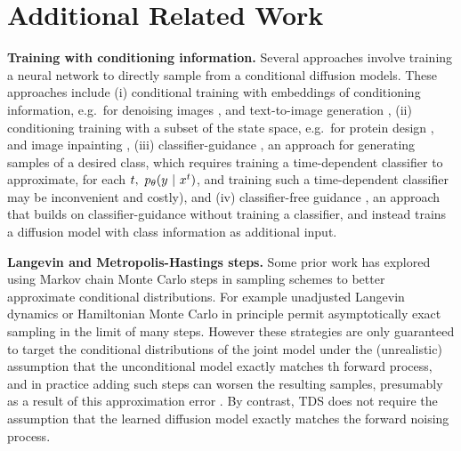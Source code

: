 \section{Additional Related Work}\label{sec:additional_related_work}

\textbf{Training with conditioning information.}
Several approaches involve training a neural network to directly sample from a conditional diffusion models.
These approaches include
(i) conditional training with embeddings of conditioning information, e.g.\ for denoising images \citep{saharia2022image}, and text-to-image generation \citep{ramesh2022hierarchical},
(ii) conditioning training with a subset of the state space, e.g.\ for protein design \citep{watson2022broadly}, and 
image inpainting \citep{saharia2022palette},
(iii) classifier-guidance \citep{dhariwal2021diffusion,song2020score}, an approach for generating samples of a desired class, which requires training a time-dependent classifier to approximate, for each $t,\ p_{\theta} (y~\vert~ x^{t})$, and training such a time-dependent classifier may be inconvenient and costly), and %
(iv) classifier-free guidance \citep{ho2022classifier}, an approach that builds on classifier-guidance without training a classifier, and instead trains a diffusion model with class information as  additional input.


\textbf{Langevin and Metropolis-Hastings steps.}
Some prior work has explored using Markov chain Monte Carlo steps in sampling schemes to better approximate conditional distributions.
For example unadjusted Langevin dynamics \citep{hovideo,song2020score} or Hamiltonian Monte Carlo \citep{du2023reduce} in principle permit asymptotically exact sampling in the limit of many steps.
However these strategies are only guaranteed to target the conditional distributions of the joint model under the (unrealistic) assumption that the unconditional model exactly matches th forward process, and in practice adding such steps can worsen the resulting samples, presumably as a result of this approximation error \citep{karras2022elucidating}.
By contrast, TDS does not require the assumption that the learned diffusion model exactly matches the forward noising process.